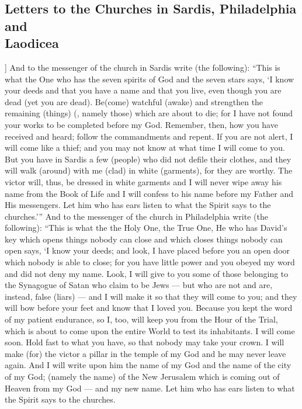 \begin{pages}
\begin{Leftside}
        			\chapter{Letters to the Churches in Sardis, Philadelphia and \\ Laodicea}
				]
		And to the messenger of the church in Sardis write (the following): “This is what the One who has the seven spirits of God and the seven stars says, ‘I know your deeds and that you have a name and that you live, even though you are dead (yet you are dead). Be(come) watchful (awake) and strengthen the remaining (things) (, namely those) which are about to die; for I have not found your works to be completed before my God. Remember, then, how you have received and heard; follow the commandments and repent. If you are not alert, I will come like a thief; and you may not know at what time I will come to you.
		\pend
		\pstart
		But you have in Sardis a few (people) who did not defile their clothes, and they will walk (around) with me (clad) in white (garments), for they are worthy. The victor will, thus, be dressed in white garments and I will never wipe away his name from the Book of Life and I will confess to his name before my Father and His messengers. Let him who has ears listen to what the Spirit says to the churches.’”
		\pend
		\pstart
		And to the messenger of the church in Philadelphia write (the following): “This is what the the Holy One, the True One, He who has David’s key which opens things nobody can close and which closes things nobody can open says, ‘I know your deeds; and look, I have placed before you an open door which nobody is able to close; for you have little power and you obeyed my word and did not deny my name. Look, I will give to you some of those belonging to the Synagogue of Satan who claim to be Jews — but who are not and are, instead, false (liars) — and I will make it so that they will come to you; and they will bow before your feet and know that I loved you. Because you kept the word of my patient endurance, so I, too, will keep you from the Hour of the Trial, which is about to come upon the entire World to test its inhabitants. I will come soon. Hold fast to what you have, so that nobody may take your crown. I will make (for) the victor a pillar in the temple of my God and he may never leave again. And I will write upon him the name of my God and the name of the city of my God; (namely the name) of the New Jerusalem which is coming out of Heaven from my God — and my new name. Let him who has ears listen to what the Spirit says to the churches.

\end{Leftside}
\end{pages}
